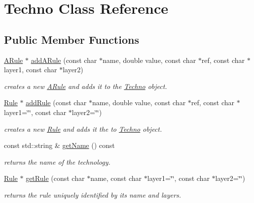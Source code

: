 \hypertarget{class_d_t_r_1_1_techno}{}\section{Techno Class Reference}
\label{class_d_t_r_1_1_techno}
\subsection*{Public Member Functions}
\begin{DoxyCompactItemize}
\item 
\hyperlink{class_d_t_r_1_1_a_rule}{A\+Rule} $\ast$ \hyperlink{class_d_t_r_1_1_techno_a5f5a790974fe7d3b1c6f1b698ef0a818}{add\+A\+Rule} (const char $\ast$name, double value, const char $\ast$ref, const char $\ast$layer1, const char $\ast$layer2)
\begin{DoxyCompactList}\small\item\em creates a new \hyperlink{class_d_t_r_1_1_a_rule}{A\+Rule} and adds it to the \hyperlink{class_d_t_r_1_1_techno}{Techno} object. \end{DoxyCompactList}\item 
\hyperlink{class_d_t_r_1_1_rule}{Rule} $\ast$ \hyperlink{class_d_t_r_1_1_techno_afa2c8412c365c950649b9f81661ecafd}{add\+Rule} (const char $\ast$name, double value, const char $\ast$ref, const char $\ast$layer1=\char`\"{}\char`\"{}, const char $\ast$layer2=\char`\"{}\char`\"{})
\begin{DoxyCompactList}\small\item\em creates a new \hyperlink{class_d_t_r_1_1_rule}{Rule} and adds it the to \hyperlink{class_d_t_r_1_1_techno}{Techno} object. \end{DoxyCompactList}\item 
\mbox{\label{class_d_t_r_1_1_techno_a3fd7335faa33dce2f87c7e50eef3e294}} 
const std\+::string \& \hyperlink{class_d_t_r_1_1_techno_a3fd7335faa33dce2f87c7e50eef3e294}{get\+Name} () const
\begin{DoxyCompactList}\small\item\em returns the name of the technology. \end{DoxyCompactList}\item 
\hyperlink{class_d_t_r_1_1_rule}{Rule} $\ast$ \hyperlink{class_d_t_r_1_1_techno_a4d56a05b47bd6c51e4e18120f49b584b}{get\+Rule} (const char $\ast$name, const char $\ast$layer1=\char`\"{}\char`\"{}, const char $\ast$layer2=\char`\"{}\char`\"{})
\begin{DoxyCompactList}\small\item\em returns the rule uniquely identified by its name and layers. \end{DoxyCompactList}\item 

\end{DoxyCompactItemize}
